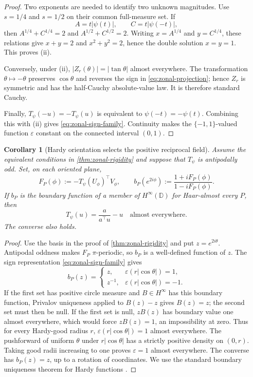 \documentclass[11pt]{article}
\numberwithin{equation}{section}
\theoremstyle{thmstyleone}%
\newtheorem{corollary}[corollary]{Corollary}
\theoremstyle{thmstyletwo}%
\let\cref\autoref
\newcommand{\D}{\mathbb D}
\begin{document}
\begin{proof}
Two exponents are needed to identify two unknown magnitudes.  Use
\(s=1/4\) and \(s=1/2\) on their common full-measure set.  If
\[
  A=t|\psi(t)|,\qquad C=t|\psi(-t)|,
\]
then \(A^{1/4}+C^{1/4}=2\) and
\(A^{1/2}+C^{1/2}=2\).  Writing \(x=A^{1/4}\) and \(y=C^{1/4}\), these
relations give \(x+y=2\) and \(x^2+y^2=2\), hence the double solution
\(x=y=1\).  This proves \textup{(ii)}.

Conversely, under \textup{(ii)},
\(|Z_r(\theta)|=|\tan\theta|\) almost everywhere.  The transformation
\(\theta\mapsto-\theta\) preserves \(\cos\theta\) and reverses the sign in
\cref{eq:zonal-projection}; hence \(Z_r\) is symmetric and has the
half-Cauchy absolute-value law.  It is therefore standard Cauchy.

Finally, \(T_\psi(-u)=-T_\psi(u)\) is equivalent to
\(\psi(-t)=-\psi(t)\).  Combining this with \textup{(ii)} gives
\cref{eq:zonal-sign-family}.  Continuity makes the
\(\{-1,1\}\)-valued function \(\varepsilon\) constant on the connected
interval \((0,1)\).
\end{proof}

\begin{corollary}[Hardy orientation selects the positive reciprocal field]
\label{cor:zonal-hardy-orientation}
Assume the equivalent conditions in \cref{thm:zonal-rigidity} and suppose
that \(T_\psi\) is antipodally odd.  Set, on each oriented plane,
\[
  F_P(\phi):=-T_\psi(U_\phi)^\top V_\phi,
  \qquad
  b_P(e^{2i\phi})
  :=
  \frac{1+iF_P(\phi)}{1-iF_P(\phi)}.
\]
If \(b_P\) is the boundary function of a member of \(H^\infty(\D)\) for
Haar-almost every \(P\), then
\[
  T_\psi(u)=\frac{a}{a^\top u}-u
  \quad\text{almost everywhere}.
\]
The converse also holds.
\end{corollary}

\begin{proof}
Use the basis in the proof of \cref{thm:zonal-rigidity} and put
\(z=e^{2i\theta}\).  Antipodal oddness makes \(F_P\) \(\pi\)-periodic, so
\(b_P\) is a well-defined function of \(z\).  The sign representation
\cref{eq:zonal-sign-family} gives
\[
  b_P(z)=
  \begin{cases}
    z,&\varepsilon(r|\cos\theta|)=1,\\
    z^{-1},&\varepsilon(r|\cos\theta|)=-1.
  \end{cases}
\]
If the first set has positive circle measure and \(B\in H^\infty\) has this
boundary function, Privalov uniqueness applied to \(B(z)-z\) gives
\(B(z)=z\); the second set must then be null.  If the first set is null,
\(zB(z)\) has boundary value one almost everywhere, which would force
\(zB(z)=1\), an impossibility at zero.  Thus for every Hardy-good radius
\(r\), \(\varepsilon(r|\cos\theta|)=1\) almost everywhere.  The pushforward
of uniform \(\theta\) under \(r|\cos\theta|\) has a strictly positive
density on \((0,r)\).  Taking good radii increasing to one proves
\(\varepsilon=1\) almost everywhere.  The converse has \(b_P(z)=z\), up to
a rotation of coordinates.  We use the standard boundary uniqueness
theorem for Hardy functions \cite{duren-1970}.
\end{proof}
\end{document}
